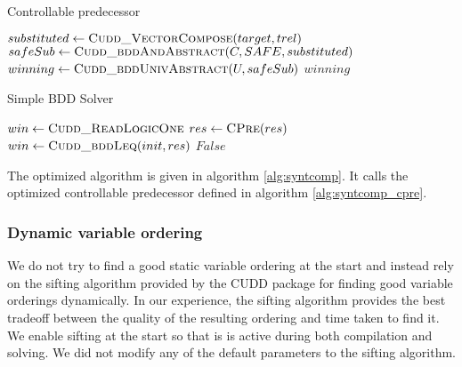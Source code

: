 \begin{algorithm}
\caption{Controllable predecessor}
\label{alg:syntcomp_cpre}

\begin{algorithmic}


    \State $substituted \gets \Call{Cudd\_VectorCompose}{target, trel}$
    \State $safeSub     \gets \Call{Cudd\_bddAndAbstract}{C, SAFE, substituted}$
    \State $winning     \gets \Call{Cudd\_bddUnivAbstract}{U, safeSub}$
    \State \Return $winning$

\EndFunction

\end{algorithmic}
\end{algorithm}

\begin{algorithm}
\caption{Simple BDD Solver}
\label{alg:syntcomp}

\begin{algorithmic}


    \State $win \gets \Call{Cudd\_ReadLogicOne}{}$
    \Loop
        \State $res \gets \Call{CPre}{res}$
        \State $win \gets \Call{Cudd\_bddLeq}{init, res}$
            \State \Return $False$
        \EndIf
    \EndLoop

\EndFunction

\end{algorithmic}
\end{algorithm}

The optimized algorithm is given in algorithm \ref{alg:syntcomp}. It calls the optimized controllable predecessor defined in algorithm \ref{alg:syntcomp_cpre}.

\subsubsection{Dynamic variable ordering}
We do not try to find a good static variable ordering at the start and instead rely on the sifting algorithm provided by the CUDD package for finding good variable orderings dynamically. In our experience, the sifting algorithm provides the best tradeoff between the quality of the resulting ordering and time taken to find it. We enable sifting at the start so that is is active during both compilation and solving. We did not modify any of the default parameters to the sifting algorithm.


